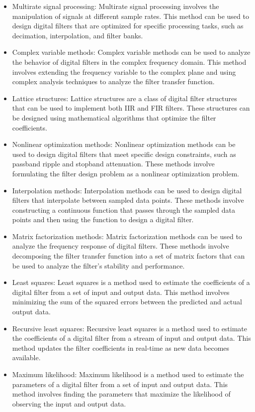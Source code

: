 \begin{itemize}
        \item Multirate signal processing: Multirate signal processing involves the manipulation of signals at different sample rates. This method can be used to design digital filters that are optimized for specific processing tasks, such as decimation, interpolation, and filter banks.
        \item Complex variable methods: Complex variable methods can be used to analyze the behavior of digital filters in the complex frequency domain. This method involves extending the frequency variable to the complex plane and using complex analysis techniques to analyze the filter transfer function.
        \item Lattice structures: Lattice structures are a class of digital filter structures that can be used to implement both IIR and FIR filters. These structures can be designed using mathematical algorithms that optimize the filter coefficients.
        \item Nonlinear optimization methods: Nonlinear optimization methods can be used to design digital filters that meet specific design constraints, such as passband ripple and stopband attenuation. These methods involve formulating the filter design problem as a nonlinear optimization problem.
        \item Interpolation methods: Interpolation methods can be used to design digital filters that interpolate between sampled data points. These methods involve constructing a continuous function that passes through the sampled data points and then using the function to design a digital filter.
        \item Matrix factorization methods: Matrix factorization methods can be used to analyze the frequency response of digital filters. These methods involve decomposing the filter transfer function into a set of matrix factors that can be used to analyze the filter's stability and performance.
        \item Least squares: Least squares is a method used to estimate the coefficients of a digital filter from a set of input and output data. This method involves minimizing the sum of the squared errors between the predicted and actual output data.
        \item Recursive least squares: Recursive least squares is a method used to estimate the coefficients of a digital filter from a stream of input and output data. This method updates the filter coefficients in real-time as new data becomes available.
        \item Maximum likelihood: Maximum likelihood is a method used to estimate the parameters of a digital filter from a set of input and output data. This method involves finding the parameters that maximize the likelihood of observing the input and output data.

\end{itemize}
